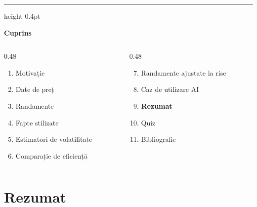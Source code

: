 \documentclass[9pt, aspectratio=169, t]{beamer}
\theoremstyle{definition}
\begin{document}
{
\begin{frame}{}
    {\color{FooterGray}\hrule height 0.4pt}
    \vspace{0.1cm}
    {\Large\textcolor{IDAred}{\textbf{Cuprins}}}
    \vspace{0.2cm}
    {\small
    \begin{columns}[T]
        \begin{column}{0.48\textwidth}
            \begin{enumerate}
                \item Motivație \checkmark
                \item Date de preț \checkmark
                \item Randamente \checkmark
                \item Fapte stilizate \checkmark
                \item Estimatori de volatilitate \checkmark
                \item Comparație de eficiență \checkmark
            \end{enumerate}
        \end{column}
        \begin{column}{0.48\textwidth}
            \begin{enumerate}\setcounter{enumi}{6}
                \item Randamente ajustate la risc \checkmark
                \item Caz de utilizare AI \checkmark
                \item \textbf{Rezumat}
                \item Quiz
                \item Bibliografie
            \end{enumerate}
        \end{column}
    \end{columns}
    }
\end{frame}
}

\section{Rezumat}
\end{document}

